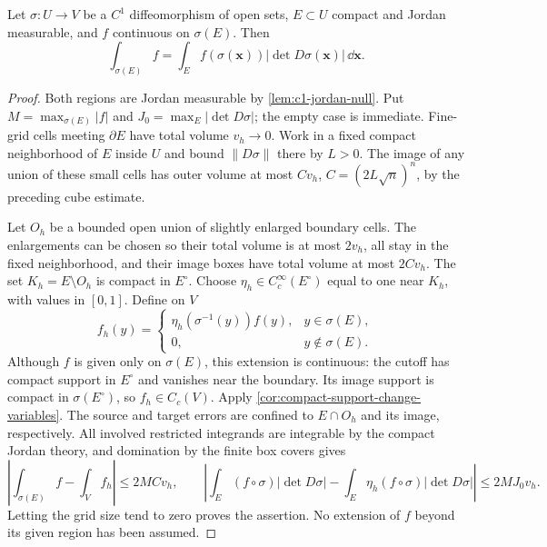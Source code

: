 \begin{corollary}
\label{cor:jordan-nonlinear-change}
Let $\sigma:U\to V$ be a $C^1$ diffeomorphism of open sets,
$E\subset U$ compact and Jordan measurable, and $f$ continuous on
$\sigma(E)$. Then
\[
\int_{\sigma(E)}f=\int_E f(\sigma(\mathbf{x}))|\det D\sigma(\mathbf{x})|\,\dd\mathbf{x}.
\]
\end{corollary}
\begin{proof}
Both regions are Jordan measurable by \cref{lem:c1-jordan-null}.
Put $M=\max_{\sigma(E)}|f|$ and $J_0=\max_E|\det D\sigma|$;
the empty case is immediate. Fine-grid cells meeting $\partial E$
have total volume $v_h\to0$. Work in a fixed compact neighborhood of
$E$ inside $U$ and bound $\|D\sigma\|$ there by $L>0$.
The image of any union of these small cells has outer volume at most
$Cv_h$, $C=(2L\sqrt n)^n$, by the preceding cube estimate.

Let $O_h$ be a bounded open union of slightly enlarged boundary cells.
The enlargements can be chosen so their total volume is at most $2v_h$,
all stay in the fixed neighborhood, and their image boxes have total
volume at most $2Cv_h$. The set $K_h=E\setminus O_h$ is compact in
$E^\circ$. Choose $\eta_h\in C_c^\infty(E^\circ)$ equal to one near
$K_h$, with values in $[0,1]$. Define on $V$
\[
f_h(y)=
\begin{cases}
\eta_h(\sigma^{-1}(y))f(y),&y\in\sigma(E),\\
0,&y\notin\sigma(E).
\end{cases}
\]
Although $f$ is given only on $\sigma(E)$, this extension is continuous:
the cutoff has compact support in $E^\circ$ and vanishes near the
boundary. Its image support is compact in $\sigma(E^\circ)$, so
$f_h\in C_c(V)$. Apply \cref{cor:compact-support-change-variables}.
The source and target errors are confined to $E\cap O_h$ and its
image, respectively. All involved restricted integrands are integrable
by the compact Jordan theory, and domination by the finite box covers
gives
\[
\left|\int_{\sigma(E)}f-\int_V f_h\right|\leq2MCv_h,
\qquad
\left|\int_E(f\circ\sigma)|\det D\sigma|
-\int_E\eta_h(f\circ\sigma)|\det D\sigma|\right|\leq2MJ_0v_h.
\]
Letting the grid size tend to zero proves the assertion. No extension
of $f$ beyond its given region has been assumed.
\end{proof}

